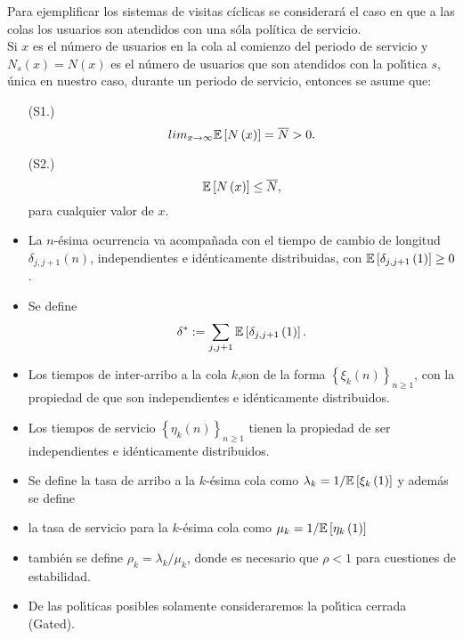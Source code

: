 Para ejemplificar los sistemas de visitas c\'iclicas se
considerar\'a el caso en que a las colas los usuarios son atendidos con
una s\'ola pol\'itica de servicio.\\
Si $x$ es el n{\'u}mero de usuarios en la cola al comienzo del
periodo de servicio y $N_{s}\left(x\right)=N\left(x\right)$ es el
n{\'u}mero de usuarios que son atendidos con la pol{\'\i}tica $s$,
{\'u}nica en nuestro caso, durante un periodo de servicio,
entonces se asume que:
\begin{itemize}
\item[(S1.)]
\begin{equation}\label{S1}
lim_{x\rightarrow\infty}\mathbb{E}\left[N\left(x\right)\right]=\overline{N}>0.
\end{equation}
\item[(S2.)]
\begin{equation}\label{S2}
\mathbb{E}\left[N\left(x\right)\right]\leq \overline{N}, \end{equation}
para cualquier valor de $x$. \item La $n$-{\'e}sima ocurrencia va
acompa{\~n}ada con el tiempo de cambio de longitud
$\delta_{j,j+1}\left(n\right)$, independientes e id{\'e}nticamente
distribuidas, con
$\mathbb{E}\left[\delta_{j,j+1}\left(1\right)\right]\geq0$. \item Se
define
\begin{equation}
\delta^{*}:=\sum_{j,j+1}\mathbb{E}\left[\delta_{j,j+1}\left(1\right)\right].
\end{equation}

\item Los tiempos de inter-arribo a la cola $k$,son de la forma
$\left\{\xi_{k}\left(n\right)\right\}_{n\geq1}$, con la propiedad
de que son independientes e id{\'e}nticamente distribuidos.

\item Los tiempos de servicio
$\left\{\eta_{k}\left(n\right)\right\}_{n\geq1}$ tienen la
propiedad de ser independientes e id{\'e}nticamente distribuidos.

\item Se define la tasa de arribo a la $k$-{\'e}sima cola como
$\lambda_{k}=1/\mathbb{E}\left[\xi_{k}\left(1\right)\right]$ y
adem{\'a}s se define

\item la tasa de servicio para la $k$-{\'e}sima cola como
$\mu_{k}=1/\mathbb{E}\left[\eta_{k}\left(1\right)\right]$

\item tambi{\'e}n se define $\rho_{k}=\lambda_{k}/\mu_{k}$, donde
es necesario que $\rho<1$ para cuestiones de estabilidad.

\item De las pol{\'\i}ticas posibles solamente consideraremos la
pol{\'\i}tica cerrada (Gated).
\end{itemize}

